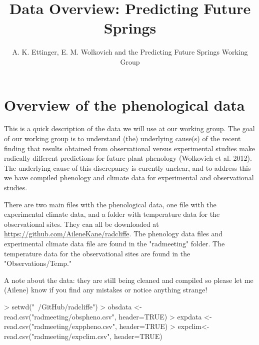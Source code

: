 \documentclass{article}
\begin{document}
% 
\title{Data Overview: Predicting Future Springs} %
\author{A. K. Ettinger, E. M. Wolkovich and the Predicting Future Springs Working Group}
\maketitle  %
\section {Overview of the phenological data}

This is a quick description of the data we will use at our working group. The goal of our working group is to understand (the) underlying cause(s) of the recent finding that results obtained from observational versus experimental studies make radically different predictions for future plant phenology (Wolkovich et al. 2012). The underlying cause of this discrepancy is curently unclear, and to address this we have compiled phenology and climate data for experimental and observational studies. 

There are two main files with the phenological data, one file with the experimental climate data, and a folder with temperature data for the observational sites. They can all be downloaded at \url{https://github.com/AileneKane/radcliffe}. The phenology data files and experimental climate data file are found in the "radmeeting" folder. The temperature data for the observational sites are found in the "Observations/Temp."

A note about the data: they are still being cleaned and compiled so please let me (Ailene) know if you find any mistakes or notice anything strange! 

\begin{Schunk}
\begin{Sinput}
> setwd("~/GitHub/radcliffe")
> obsdata <- read.csv("radmeeting/obspheno.csv", header=TRUE)
> expdata <- read.csv("radmeeting/exppheno.csv", header=TRUE)
> expclim<-read.csv("radmeeting/expclim.csv", header=TRUE)
\end{Sinput}
\end{Schunk}
\end{document}
